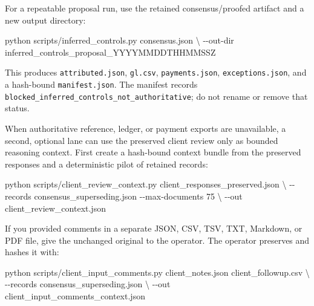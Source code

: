 \documentclass[
]{article}
\newenvironment{Shaded}{}{}
\newcommand{\AttributeTok}[1]{\textcolor[rgb]{0.49,0.56,0.16}{#1}}
\newcommand{\DataTypeTok}[1]{\textcolor[rgb]{0.56,0.13,0.00}{#1}}
\newcommand{\ExtensionTok}[1]{#1}
\newcommand{\NormalTok}[1]{#1}
\begin{document}
For a repeatable proposal run, use the retained consensus/proofed
artifact and a new output directory:

\begin{Shaded}
\begin{Highlighting}[]
\ExtensionTok{python}\NormalTok{ scripts/inferred\_controls.py consensus.json }\DataTypeTok{\textbackslash{}}
  \AttributeTok{{-}{-}out{-}dir}\NormalTok{ inferred\_controls\_proposal\_YYYYMMDDTHHMMSSZ}
\end{Highlighting}
\end{Shaded}

This produces \texttt{attributed.json}, \texttt{gl.csv},
\texttt{payments.json}, \texttt{exceptions.json}, and a hash-bound
\texttt{manifest.json}. The manifest records
\texttt{blocked\_\allowbreak{}inferred\_\allowbreak{}controls\_\allowbreak{}not\_\allowbreak{}authoritative};
do not rename or remove that status.

When authoritative reference, ledger, or payment exports are
unavailable, a second, optional lane can use the preserved client review
only as bounded reasoning context. First create a hash-bound context
bundle from the preserved responses and a deterministic pilot of
retained records:

\begin{Shaded}
\begin{Highlighting}[]
\ExtensionTok{python}\NormalTok{ scripts/client\_review\_context.py client\_responses\_preserved.json }\DataTypeTok{\textbackslash{}}
  \AttributeTok{{-}{-}records}\NormalTok{ consensus\_superseding.json }\AttributeTok{{-}{-}max{-}documents}\NormalTok{ 75 }\DataTypeTok{\textbackslash{}}
  \AttributeTok{{-}{-}out}\NormalTok{ client\_review\_context.json}
\end{Highlighting}
\end{Shaded}

If you provided comments in a separate JSON, CSV, TSV, TXT, Markdown, or
PDF file, give the unchanged original to the operator. The operator
preserves and hashes it with:

\begin{Shaded}
\begin{Highlighting}[]
\ExtensionTok{python}\NormalTok{ scripts/client\_input\_comments.py client\_notes.json client\_followup.csv }\DataTypeTok{\textbackslash{}}
  \AttributeTok{{-}{-}records}\NormalTok{ consensus\_superseding.json }\DataTypeTok{\textbackslash{}}
  \AttributeTok{{-}{-}out}\NormalTok{ client\_input\_comments\_context.json}
\end{Highlighting}
\end{Shaded}
\end{document}
